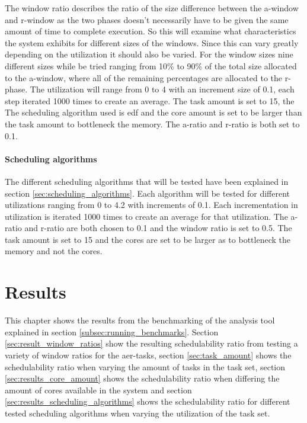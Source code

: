 \documentclass{kththesis}
\begin{document}
The window ratio describes the ratio of the size difference between the \acrshort{a}-window and
\acrshort{r}-window as the two phases doesn't necessarily have to be given the same amount of time
to complete execution. So this will examine what characteristics the system exhibits for different
sizes of the windows. Since this can vary greatly depending on the utilization it should also be
varied. For the window sizes nine different sizes while be tried ranging from 10\% to 90\% of the
total size allocated to the \acrshort{a}-window, where all of the remaining percentages are
allocated to the \acrshort{r}-phase. The utilization will range from 0 to 4 with an increment size
of 0.1, each step iterated 1000 times to create an average. The task amount is set to 15, the The
scheduling algorithm used is \acrshort{edf} and the core amount is set to be larger than the task
amount to bottleneck the memory. The \acrshort{a}-ratio and \acrshort{r}-ratio is both set to 0.1.

\subsubsection{Scheduling algorithms}

The different scheduling algorithms that will be tested have been explained in section
\ref{sec:scheduling_algorithms}. Each algorithm will be tested for different utilizations ranging
from 0 to 4.2 with increments of 0.1. Each incrementation in utilization is iterated 1000 times to
create an average for that utilization. The \acrshort{a}-ratio and \acrshort{r}-ratio are both
chosen to 0.1 and the window ratio is set to 0.5. The task amount is set to 15 and the cores are set
to be larger as to bottleneck the memory and not the cores.


\chapter{Results} \label{ch:result}

This chapter shows the results from the benchmarking of the analysis tool explained in section
\ref{subsec:running_benchmarks}. Section \ref{sec:result_window_ratios} show the resulting
schedulability ratio from testing a variety of window ratios for the \acrshort{aer}-tasks, section
\ref{sec:task_amount} shows the schedulability ratio when varying the amount of tasks in the task
set, section \ref{sec:results_core_amount} shows the schedulability ratio when differing the amount of cores
available in the system and section \ref{sec:results_scheduling_algorithms} shows the schedulability
ratio for different tested scheduling algorithms when varying the utilization of the task set.
\end{document}
